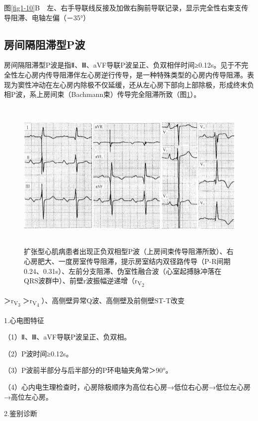 图\ref{fig1-10}B　左、右手导联线反接及加做右胸前导联记录，显示完全性右束支传导阻滞、电轴左偏（－35°）

\protect\hypertarget{text00007.htmlux5cux23subid11}{}{}

\subsection{房间隔阻滞型P波}

房间隔阻滞型P波是指Ⅱ、Ⅲ、aVF导联P波呈正、负双相伴时间≥0.12s。见于不完全性左心房内传导阻滞伴左心房逆行传导，是一种特殊类型的心房内传导阻滞。表现为窦性冲动在左心房内除极不仅延缓，还从左心房下部向上部除极，形成终末负相P波，系上房间束（Bachmann束）传导完全阻滞所致（图\ref{fig1-11}）。

\begin{figure}[!htbp]
 \centering
 \includegraphics[width=5.72917in,height=2.89583in]{./images/Image00017.jpg}
 \captionsetup{justification=centering}
 \caption{扩张型心肌病患者出现正负双相型P波（上房间束传导阻滞所致）、右心房肥大、一度房室传导阻滞，提示房室结内双径路传导（P-R间期0.24、0.31s）、左前分支阻滞、伪室性融合波（心室起搏脉冲落在QRS波群中）、前壁r波振幅逆递增（r\textsubscript{V\textsubscript{2}}}
 \label{fig1-11}
  \end{figure} 
＞r\textsubscript{V\textsubscript{3}}
＞r\textsubscript{V\textsubscript{4}}
）、高侧壁异常Q波、高侧壁及前侧壁ST-T改变

1.心电图特征

（1）Ⅱ、Ⅲ、aVF导联P波呈正、负双相。

（2）P波时间≥0.12s。

（3）P波前半部分与后半部分的P环电轴夹角常＞90°。

（4）心内电生理检查时，心房除极顺序为高位右心房→低位右心房→低位左心房→高位左心房。

2.鉴别诊断

